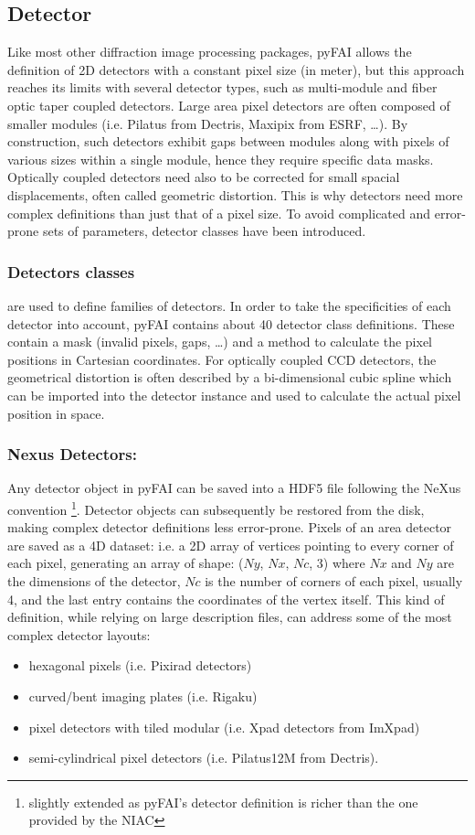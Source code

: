 \documentclass{iucr}
\begin{document}
\subsection{Detector}
Like most other diffraction image processing packages, pyFAI allows the definition of
2D detectors with a constant pixel size (in meter), but this approach reaches its limits
with several detector types, such as multi-module and fiber optic taper coupled detectors.
Large area pixel detectors are often composed of smaller modules (i.e. Pilatus
from Dectris, Maxipix from ESRF,
\ldots).
By construction, such detectors exhibit gaps between modules along with
pixels of various sizes within a single module, hence they require specific
data masks.
Optically coupled detectors need also to be corrected
for small spacial displacements, often called geometric distortion.
This is why detectors need more complex definitions than just that of a pixel
size.
To avoid complicated and error-prone sets of parameters, detector classes have
been introduced.

\subsubsection{Detectors classes} are used to define families of detectors.
In order to take the specificities of each detector into account, pyFAI
contains about 40 detector class definitions. These contain a mask
(invalid pixels, gaps, \ldots) and a method to calculate the pixel positions in Cartesian
coordinates.
For optically coupled CCD detectors, the geometrical distortion is often
described by a bi-dimensional cubic spline which can be imported into
the detector instance and used to calculate the actual pixel position in space.

\subsubsection{Nexus Detectors:}
Any detector object in pyFAI can be saved into a HDF5 file following the NeXus
convention \cite{nexus}\footnote{slightly extended as pyFAI's detector
definition is richer than the one provided by the NIAC}.
Detector objects can subsequently be restored from the disk, making
complex detector definitions less error-prone.
Pixels of an area detector are saved as a 4D dataset: i.e. a 2D
array of vertices pointing to every corner of each pixel, generating
an array of shape: ($Ny$, $Nx$, $Nc$, 3) where $Nx$ and $Ny$ are the dimensions of the
detector, $Nc$ is the number of corners of each pixel, usually 4, and the last
entry contains the coordinates of the vertex itself.
This kind of definition, while relying on large description files,
can address some of the most complex detector layouts:
\begin{itemize}
  \item hexagonal pixels (i.e. Pixirad detectors)
  \item curved/bent imaging plates (i.e. Rigaku)
  \item pixel detectors with tiled modular  (i.e. Xpad detectors from ImXpad)
  \item semi-cylindrical pixel detectors (i.e. Pilatus12M from Dectris).
\end{itemize}
\end{document}
